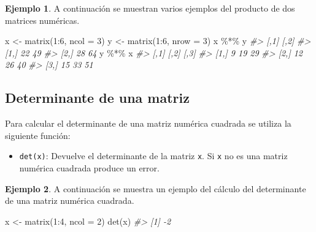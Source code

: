 \documentclass[
]{book}
\newenvironment{Shaded}{\begin{snugshade}}{\end{snugshade}}
\newcommand{\AttributeTok}[1]{\textcolor[rgb]{0.77,0.63,0.00}{#1}}
\newcommand{\CommentTok}[1]{\textcolor[rgb]{0.56,0.35,0.01}{\textit{#1}}}
\newcommand{\DecValTok}[1]{\textcolor[rgb]{0.00,0.00,0.81}{#1}}
\newcommand{\FunctionTok}[1]{\textcolor[rgb]{0.00,0.00,0.00}{#1}}
\newcommand{\NormalTok}[1]{#1}
\newcommand{\OtherTok}[1]{\textcolor[rgb]{0.56,0.35,0.01}{#1}}
\newcommand{\SpecialCharTok}[1]{\textcolor[rgb]{0.00,0.00,0.00}{#1}}
\providecommand{\tightlist}{%
  \setlength{\itemsep}{0pt}\setlength{\parskip}{0pt}}
\theoremstyle{definition}
\theoremstyle{definition}
\newtheorem{example}{Ejemplo}[chapter]
\theoremstyle{definition}
\theoremstyle{definition}
\theoremstyle{remark}
\begin{document}
\begin{example}

A continuación se muestran varios ejemplos del producto de dos matrices numéricas.

\begin{Shaded}
\begin{Highlighting}[]
\NormalTok{x }\OtherTok{\textless{}{-}} \FunctionTok{matrix}\NormalTok{(}\DecValTok{1}\SpecialCharTok{:}\DecValTok{6}\NormalTok{, }\AttributeTok{ncol =} \DecValTok{3}\NormalTok{)}
\NormalTok{y }\OtherTok{\textless{}{-}} \FunctionTok{matrix}\NormalTok{(}\DecValTok{1}\SpecialCharTok{:}\DecValTok{6}\NormalTok{, }\AttributeTok{nrow =} \DecValTok{3}\NormalTok{)}
\NormalTok{x }\SpecialCharTok{\%*\%}\NormalTok{ y}
\CommentTok{\#\textgreater{}      [,1] [,2]}
\CommentTok{\#\textgreater{} [1,]   22   49}
\CommentTok{\#\textgreater{} [2,]   28   64}
\NormalTok{y }\SpecialCharTok{\%*\%}\NormalTok{ x}
\CommentTok{\#\textgreater{}      [,1] [,2] [,3]}
\CommentTok{\#\textgreater{} [1,]    9   19   29}
\CommentTok{\#\textgreater{} [2,]   12   26   40}
\CommentTok{\#\textgreater{} [3,]   15   33   51}
\end{Highlighting}
\end{Shaded}

\end{example}

\hypertarget{determinante-de-una-matriz}{%
\subsection{Determinante de una matriz}\label{determinante-de-una-matriz}}

Para calcular el determinante de una matriz numérica cuadrada se utiliza la siguiente función:

\begin{itemize}
\tightlist
\item
  \texttt{det(x)}: Devuelve el determinante de la matriz \texttt{x}. Si \texttt{x} no es una matriz numérica cuadrada produce un error.
\end{itemize}

\begin{example}

A continuación se muestra un ejemplo del cálculo del determinante de una matriz numérica cuadrada.

\begin{Shaded}
\begin{Highlighting}[]
\NormalTok{x }\OtherTok{\textless{}{-}} \FunctionTok{matrix}\NormalTok{(}\DecValTok{1}\SpecialCharTok{:}\DecValTok{4}\NormalTok{, }\AttributeTok{ncol =} \DecValTok{2}\NormalTok{)}
\FunctionTok{det}\NormalTok{(x)}
\CommentTok{\#\textgreater{} [1] {-}2}
\end{Highlighting}
\end{Shaded}

\end{example}
\end{document}
